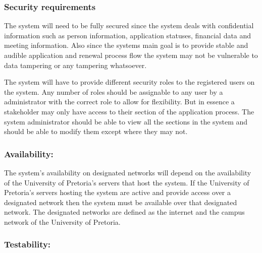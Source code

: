 \subsubsection{Security requirements}

\begin{flushleft}

The system will need to be fully secured since the system deals with confidential information such as person information, application statuses, financial data and meeting information. Also since the systems main goal is to provide stable and audible application and renewal process flow the system may not be vulnerable to data tampering or any tampering whatsoever. \\
\vspace{0.1in}

The system will have to provide different security roles to the registered users on the system. Any number of roles should be assignable to any user by a administrator with the correct role to allow for flexibility.
But in essence a stakeholder may only have access to their section of the application process. The system administrator should be able to view all the sections in the system and should be able to modify them except where they may not.

\end{flushleft}

\vspace{0.1in}

\subsubsection{Availability:}

\begin{flushleft}

The system's availability on designated networks will depend on the availability of the University of Pretoria's servers that host the system. If the University of Pretoria's servers hosting the system are active and provide access over a designated network then the system must be available over that designated network. The designated networks are defined as the internet and the campus network of the University of Pretoria.

\end{flushleft}

\vspace{0.1in}

\subsubsection{Testability:}

